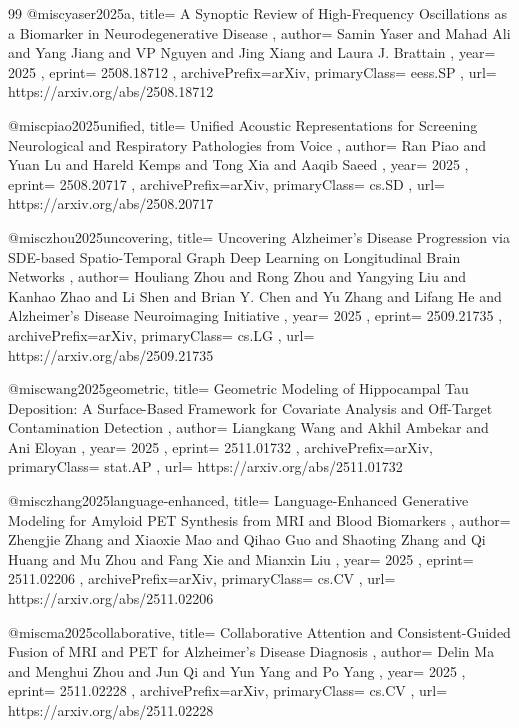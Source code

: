 \documentclass[11pt,a4paper]{article}
\begin{document}
\begin{thebibliography}{99}
@misc{yaser2025a,
  title={ A Synoptic Review of High-Frequency Oscillations as a Biomarker in Neurodegenerative Disease },
  author={ Samin Yaser and Mahad Ali and Yang Jiang and VP Nguyen and Jing Xiang and Laura J. Brattain },
  year={ 2025 },
  eprint={ 2508.18712 },
  archivePrefix={arXiv},
  primaryClass={ eess.SP },
  url={ https://arxiv.org/abs/2508.18712 }
}


@misc{piao2025unified,
  title={ Unified Acoustic Representations for Screening Neurological and Respiratory Pathologies from Voice },
  author={ Ran Piao and Yuan Lu and Hareld Kemps and Tong Xia and Aaqib Saeed },
  year={ 2025 },
  eprint={ 2508.20717 },
  archivePrefix={arXiv},
  primaryClass={ cs.SD },
  url={ https://arxiv.org/abs/2508.20717 }
}


@misc{zhou2025uncovering,
  title={ Uncovering Alzheimer's Disease Progression via SDE-based Spatio-Temporal Graph Deep Learning on Longitudinal Brain Networks },
  author={ Houliang Zhou and Rong Zhou and Yangying Liu and Kanhao Zhao and Li Shen and Brian Y. Chen and Yu Zhang and Lifang He and Alzheimer's Disease Neuroimaging Initiative },
  year={ 2025 },
  eprint={ 2509.21735 },
  archivePrefix={arXiv},
  primaryClass={ cs.LG },
  url={ https://arxiv.org/abs/2509.21735 }
}


@misc{wang2025geometric,
  title={ Geometric Modeling of Hippocampal Tau Deposition: A Surface-Based Framework for Covariate Analysis and Off-Target Contamination Detection },
  author={ Liangkang Wang and Akhil Ambekar and Ani Eloyan },
  year={ 2025 },
  eprint={ 2511.01732 },
  archivePrefix={arXiv},
  primaryClass={ stat.AP },
  url={ https://arxiv.org/abs/2511.01732 }
}


@misc{zhang2025language-enhanced,
  title={ Language-Enhanced Generative Modeling for Amyloid PET Synthesis from MRI and Blood Biomarkers },
  author={ Zhengjie Zhang and Xiaoxie Mao and Qihao Guo and Shaoting Zhang and Qi Huang and Mu Zhou and Fang Xie and Mianxin Liu },
  year={ 2025 },
  eprint={ 2511.02206 },
  archivePrefix={arXiv},
  primaryClass={ cs.CV },
  url={ https://arxiv.org/abs/2511.02206 }
}


@misc{ma2025collaborative,
  title={ Collaborative Attention and Consistent-Guided Fusion of MRI and PET for Alzheimer's Disease Diagnosis },
  author={ Delin Ma and Menghui Zhou and Jun Qi and Yun Yang and Po Yang },
  year={ 2025 },
  eprint={ 2511.02228 },
  archivePrefix={arXiv},
  primaryClass={ cs.CV },
  url={ https://arxiv.org/abs/2511.02228 }
}


\end{thebibliography}
\end{document}
